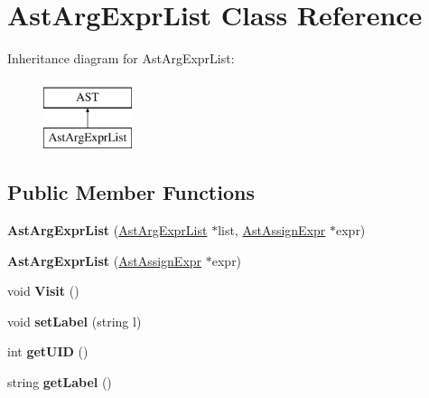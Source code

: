 \hypertarget{classAstArgExprList}{\section{Ast\-Arg\-Expr\-List Class Reference}
\label{classAstArgExprList}
}
Inheritance diagram for Ast\-Arg\-Expr\-List\-:\begin{figure}[H]
\begin{center}
\leavevmode
\includegraphics[height=2.000000cm]{classAstArgExprList}
\end{center}
\end{figure}
\subsection*{Public Member Functions}
\begin{DoxyCompactItemize}
\item 
\hypertarget{classAstArgExprList_a6aafae6eaadd5db52a33768136657610}{{\bfseries Ast\-Arg\-Expr\-List} (\hyperlink{classAstArgExprList}{Ast\-Arg\-Expr\-List} $\ast$list, \hyperlink{classAstAssignExpr}{Ast\-Assign\-Expr} $\ast$expr)}\label{classAstArgExprList_a6aafae6eaadd5db52a33768136657610}

\item 
\hypertarget{classAstArgExprList_a4acc4d03bbbe66b9a19e991d21169414}{{\bfseries Ast\-Arg\-Expr\-List} (\hyperlink{classAstAssignExpr}{Ast\-Assign\-Expr} $\ast$expr)}\label{classAstArgExprList_a4acc4d03bbbe66b9a19e991d21169414}

\item 
\hypertarget{classAstArgExprList_aeac192a90197b0de59114cea84a1e577}{void {\bfseries Visit} ()}\label{classAstArgExprList_aeac192a90197b0de59114cea84a1e577}

\item 
\hypertarget{classAST_a71d680856e95ff89f55d5311a552eba6}{void {\bfseries set\-Label} (string l)}\label{classAST_a71d680856e95ff89f55d5311a552eba6}

\item 
\hypertarget{classAST_ab7a5b1d9f1c2de0d98deb356f724a42c}{int {\bfseries get\-U\-I\-D} ()}\label{classAST_ab7a5b1d9f1c2de0d98deb356f724a42c}

\item 
\hypertarget{classAST_aee029be902fffc927d16ccb03eb922ad}{string {\bfseries get\-Label} ()}\label{classAST_aee029be902fffc927d16ccb03eb922ad}

\end{DoxyCompactItemize}
